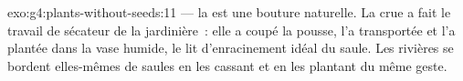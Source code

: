\begin{solution}{exo:g4:plants-without-seeds:11}
 --- la  est une bouture naturelle. La
crue a fait le travail de sécateur de la jardinière~: elle a coupé
la pousse, l'a transportée et l'a plantée dans la vase humide, le
lit d'enracinement idéal du saule. Les rivières se bordent
elles-mêmes de saules en les cassant et en les plantant du même
geste.
\end{solution}
